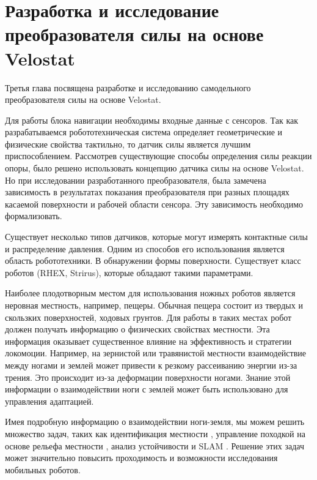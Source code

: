 \chapter{Разработка и исследование преобразователя силы на основе Velostat}\label{ch:ch3}

Третья глава посвящена разработке и исследованию самодельного преобразователя силы на основе Velostat.

Для работы блока навигации необходимы входные данные с сенсоров. Так как разрабатываемся робототехническая система определяет геометрические и физические свойства тактильно, то датчик силы является лучшим приспособлением. Рассмотрев существующие способы определения силы реакции опоры, было решено использовать концепцию датчика силы на основе Velostat. Но при исследовании разработанного преобразователя, была замечена зависимость в результатах показания преобразователя при разных площадях касаемой поверхности и рабочей области сенсора. Эту зависимость необходимо формализовать.

Существует несколько типов датчиков, которые могут измерять контактные силы и распределение давления. Одним из способов его использования является область робототехники. В обнаружении формы поверхности. Существует класс роботов (RHEX, Strirus), которые обладают такими параметрами.

Наиболее плодотворным местом для использования ножных роботов является неровная местность, например, пещеры. Обычная пещера состоит из твердых и скользких поверхностей, ходовых грунтов. Для работы в таких местах робот должен получать информацию о физических свойствах местности. Эта информация оказывает существенное влияние на эффективность и стратегии локомоции. Например, на зернистой или травянистой местности взаимодействие между ногами и землей может привести к резкому рассеиванию энергии из-за трения. Это происходит из-за деформации поверхности ногами. Знание этой информации о взаимодействии ноги с землей может быть использовано для управления адаптацией.

Имея подробную информацию о взаимодействии ноги-земля, мы можем решить множество задач, таких как идентификация местности \cite{wu_integrated_2016, walas_terrain_2015, mrva_feature_2015, dallaire_learning_2015}, управление походкой на основе рельефа местности \cite{wu_tactile_2020, weingarten_automated_2004}, анализ устойчивости и SLAM \cite{odenthal_nonlinear_1999, peters_analysis_2006, saranli_design_2000}. Решение этих задач может значительно повысить проходимость и возможности исследования мобильных роботов.

